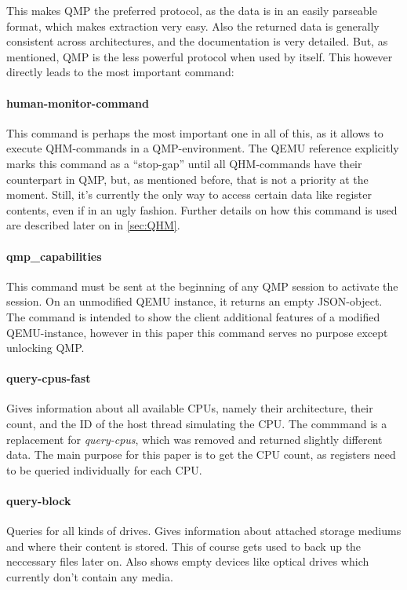 This makes QMP the preferred protocol, as the data is in an easily parseable format, which makes extraction very easy.
Also the returned data is generally consistent across architectures, and the documentation is very detailed.
But, as mentioned, QMP is the less powerful protocol when used by itself.
This however directly leads to the most important command\cite{qmp-commands}:

\paragraph{human-monitor-command}
This command is perhaps the most important one in all of this, as it allows to execute QHM-commands in a QMP-environment.
The QEMU reference explicitly marks this command as a \enquote{stop-gap} until all QHM-commands have their counterpart in QMP,
but, as mentioned before, that is not a priority at the moment.
Still, it's currently the only way to access certain data like register contents, even if in an ugly fashion.
Further details on how this command is used are described later on in \autoref{sec:QHM}.

\paragraph{qmp\_capabilities}
This command must be sent at the beginning of any QMP session to activate the session.
On an unmodified QEMU instance, it returns an empty JSON-object.
The command is intended to show the client additional features of a modified QEMU-instance,
however in this paper this command serves no purpose except unlocking QMP.

\paragraph{query-cpus-fast}
Gives information about all available CPUs, namely their architecture,
their count, and the ID of the host thread simulating the CPU.
The commmand is a replacement for \emph{query-cpus}, which was removed and returned slightly different data.
The main purpose for this paper is to get the CPU count, as registers need to be queried individually for each CPU.

\paragraph{query-block}
Queries for all kinds of drives. Gives information about attached storage mediums and where their content is stored.
This of course gets used to back up the neccessary files later on.
Also shows empty devices like optical drives which currently don't contain any media.

